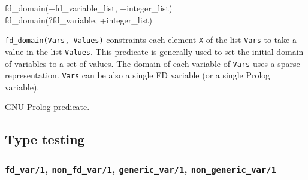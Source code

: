 \begin{TemplatesOneCol}
fd\_domain(+fd\_variable\_list, +integer\_list)\\
fd\_domain(?fd\_variable, +integer\_list)

\end{TemplatesOneCol}

\Description

\texttt{fd\_domain(Vars, Values)} constraints each element \texttt{X} of the
list \texttt{Vars} to take a value in the list \texttt{Values}. This
predicate is generally used to set the initial domain of variables to a set
of values. The domain of each variable of \texttt{Vars} uses a sparse
representation. \texttt{Vars} can be also a single FD variable (or a single
Prolog variable).

\begin{PlErrors}







\end{PlErrors}

\Portability

GNU Prolog predicate.

\subsection{Type testing}

\subsubsection{\texttt{fd\_var/1}, \texttt{non\_fd\_var/1},
               \texttt{generic\_var/1},
               \texttt{non\_generic\_var/1}}

